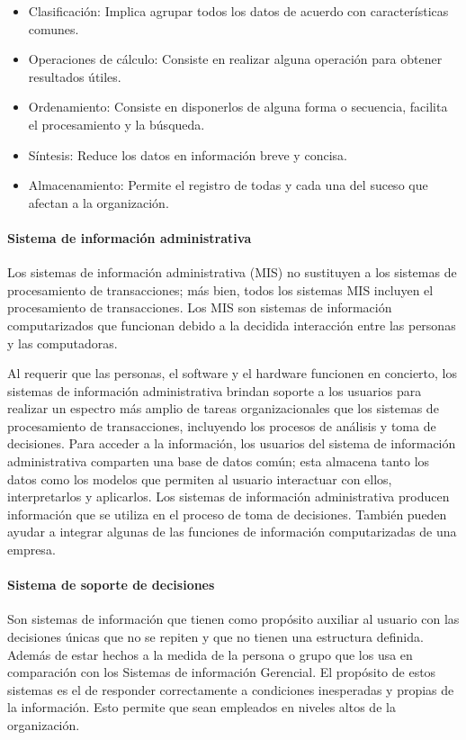 \begin{itemize}
\item Clasificación: Implica agrupar todos los datos de acuerdo con características comunes.
\item Operaciones de cálculo: Consiste en realizar alguna operación para obtener resultados útiles.  
\item Ordenamiento: Consiste en disponerlos de alguna forma o secuencia, facilita el procesamiento y la búsqueda.  
\item Síntesis: Reduce los datos en información breve y concisa. 
\item Almacenamiento: Permite el registro de todas y cada una del suceso que afectan a la organización.

\end{itemize}

\paragraph{Sistema de información administrativa}

Los sistemas de información administrativa (MIS) no sustituyen a los sistemas de procesamiento de transacciones; más bien, todos los sistemas MIS incluyen el procesamiento de transacciones\cite{kendall2005analisis}. Los MIS son sistemas de información computarizados que funcionan debido a la decidida interacción entre las personas y las computadoras.

Al requerir que las personas, el software y el hardware funcionen en concierto, los sistemas de información administrativa brindan soporte a los usuarios para realizar un espectro más amplio de tareas organizacionales que los sistemas de procesamiento de transacciones, incluyendo los procesos de análisis y toma de decisiones. Para acceder a la información, los usuarios del sistema de información administrativa comparten una base de datos común; esta almacena tanto los datos como los modelos que permiten al usuario interactuar con ellos, interpretarlos y aplicarlos. Los sistemas de información administrativa producen información que se utiliza en el proceso de toma de decisiones. También pueden ayudar a integrar algunas de las funciones de información computarizadas de una empresa. 

\paragraph{Sistema de soporte de decisiones}

Son sistemas de información que tienen como propósito auxiliar al usuario con las decisiones únicas que no se repiten y que no tienen una estructura definida\cite{kendall2005analisis}. Además de estar hechos a la medida de la persona o grupo que los usa en comparación con los Sistemas de información Gerencial. El propósito de estos sistemas es el de responder correctamente a condiciones inesperadas y propias de la información. Esto permite que sean empleados en niveles altos de la organización.  

